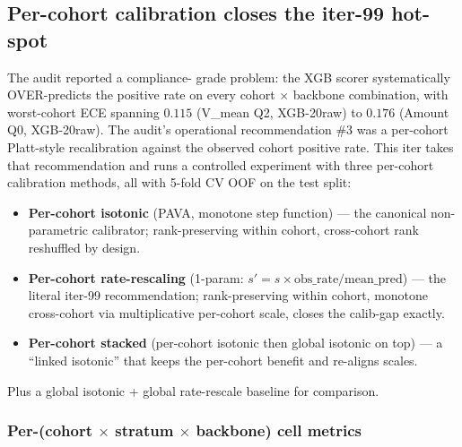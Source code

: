 \subsection{Per-cohort calibration closes the iter-99 hot-spot}
\label{sec:p8-cohort-recalibration}

The  audit reported a compliance-
grade problem: the XGB scorer systematically OVER-predicts the positive rate
on every cohort $\times$ backbone combination, with worst-cohort ECE
spanning $0.115$ (V\_mean Q2, XGB-20raw) to $0.176$ (Amount Q0, XGB-20raw).
The audit's operational recommendation \#3 was a per-cohort Platt-style
recalibration against the observed cohort positive rate. This iter takes
that recommendation and runs a controlled experiment with three per-cohort
calibration methods, all with 5-fold CV OOF on the test split:

\begin{itemize}
\item \textbf{Per-cohort isotonic} (PAVA, monotone step function) --- the
      canonical non-parametric calibrator; rank-preserving within cohort,
      cross-cohort rank reshuffled by design.
\item \textbf{Per-cohort rate-rescaling} (1-param: $s' = s \times
      \mathrm{obs\_rate} / \mathrm{mean\_pred}$) --- the literal iter-99
      recommendation; rank-preserving within cohort, monotone cross-cohort
      via multiplicative per-cohort scale, closes the calib-gap exactly.
\item \textbf{Per-cohort stacked} (per-cohort isotonic then global isotonic
      on top) --- a ``linked isotonic'' that keeps the per-cohort benefit
      and re-aligns scales.
\end{itemize}
Plus a global isotonic + global rate-rescale baseline for comparison.

\subsubsection{Per-(cohort $\times$ stratum $\times$ backbone) cell metrics}


